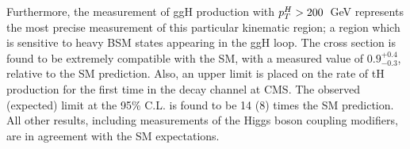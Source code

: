 Furthermore, the measurement of ggH production with $p_T^H>200$~GeV represents the most precise measurement of this particular kinematic region; a region which is sensitive to heavy BSM states appearing in the ggH loop. The cross section is found to be extremely compatible with the SM, with a measured value of $0.9^{+0.4}_{-0.3}$, relative to the SM prediction. Also, an upper limit is placed on the rate of tH production for the first time in the \Hgg decay channel at CMS. The observed (expected) limit at the 95\% C.L. is found to be 14 (8) times the SM prediction. All other results, including measurements of the Higgs boson coupling modifiers, are in agreement with the SM expectations.